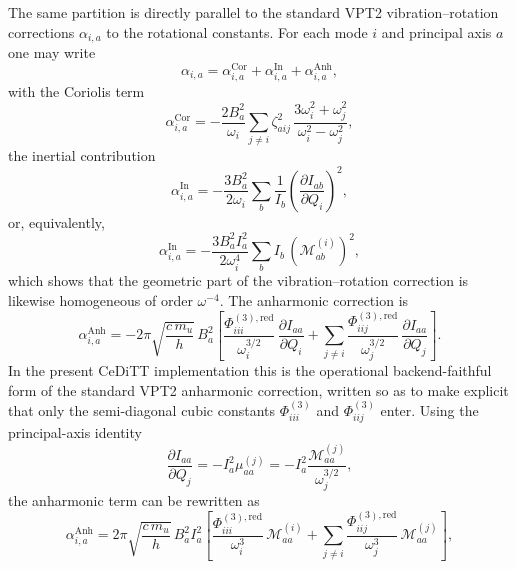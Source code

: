 \documentclass[aip,jcp,reprint,floatfix]{revtex4-2}
\begin{document}
The same partition is directly parallel to the standard VPT2
vibration--rotation corrections $\alpha_{i,a}$ to the rotational
constants. For each mode $i$ and principal axis $a$ one may write
\begin{equation}
\alpha_{i,a}
=
\alpha^{\mathrm{Cor}}_{i,a}
+
\alpha^{\mathrm{In}}_{i,a}
+
\alpha^{\mathrm{Anh}}_{i,a},
\end{equation}
with the Coriolis term
\begin{equation}
\alpha^{\mathrm{Cor}}_{i,a}
=
-\frac{2 B_a^2}{\omega_i}
\sum_{j\ne i}
\zeta_{aij}^2\,
\frac{3\omega_i^2+\omega_j^2}{\omega_i^2-\omega_j^2},
\end{equation}
the inertial contribution
\begin{equation}
\alpha^{\mathrm{In}}_{i,a}
=
-\frac{3 B_a^2}{2\omega_i}
\sum_b
\frac{1}{I_b}
\left(
\frac{\partial I_{ab}}{\partial Q_i}
\right)^2,
\end{equation}
or, equivalently,
\begin{equation}
\alpha^{\mathrm{In}}_{i,a}
=
-\frac{3 B_a^2 I_a^2}{2\omega_i^4}
\sum_b
I_b\,
\left(\mathcal{M}^{(i)}_{ab}\right)^2,
\end{equation}
which shows that the geometric part of the vibration--rotation
correction is likewise homogeneous of order $\omega^{-4}$. The
anharmonic correction is
\begin{equation}
\alpha^{\mathrm{Anh}}_{i,a}
=
-2\pi\sqrt{\frac{c\,m_u}{h}}\,
B_a^2
\left[
\frac{\Phi^{(3),\mathrm{red}}_{iii}}{\omega_i^{3/2}}\,
\frac{\partial I_{aa}}{\partial Q_i}
+
\sum_{j\ne i}
\frac{\Phi^{(3),\mathrm{red}}_{iij}}{\omega_j^{3/2}}\,
\frac{\partial I_{aa}}{\partial Q_j}
\right].
\end{equation}
In the present CeDiTT implementation this is the operational
backend-faithful form of the standard VPT2 anharmonic correction,
written so as to make explicit that only the semi-diagonal cubic
constants $\Phi^{(3)}_{iii}$ and $\Phi^{(3)}_{iij}$ enter.
Using the principal-axis identity
\begin{equation}
\frac{\partial I_{aa}}{\partial Q_j}
=
-I_a^2\mu^{(j)}_{aa}
=
-I_a^2\frac{\mathcal{M}^{(j)}_{aa}}{\omega_j^{3/2}},
\end{equation}
the anharmonic term can be rewritten as
\begin{equation}
\alpha^{\mathrm{Anh}}_{i,a}
=
2\pi\sqrt{\frac{c\,m_u}{h}}\,
B_a^2 I_a^2
\left[
\frac{\Phi^{(3),\mathrm{red}}_{iii}}{\omega_i^3}\,
\mathcal{M}^{(i)}_{aa}
+
\sum_{j\ne i}
\frac{\Phi^{(3),\mathrm{red}}_{iij}}{\omega_j^3}\,
\mathcal{M}^{(j)}_{aa}
\right],
\end{equation}
\end{document}
